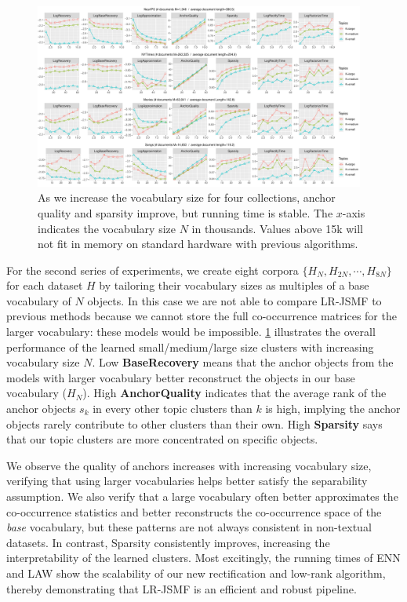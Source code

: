 \begin{figure}[ht]
 	\centering
	\includegraphics[width=0.97\textwidth, trim={1.0cm 1.0cm 1.0cm 0.0cm}]
	{./lrtm/pics/real_TopicsPerVocabs_new-plain.pdf}
	\caption{As we increase the vocabulary size for four collections, anchor
	quality and sparsity improve, but running time is stable. The $x$\hyp{}axis
	indicates the vocabulary size $N$ in thousands. Values above 15k will not fit
	in memory on standard hardware with previous algorithms.}
	\label{fig:results-vocabs}
\end{figure}

For the second series of experiments, we create eight corpora $\{H_N, H_{2N},
\cdots, H_{8N}\}$ for each dataset $H$ by tailoring their vocabulary sizes as
multiples of a base vocabulary of $N$ objects. In this case we are not able to
compare LR\hyp{}JSMF to previous methods because we cannot store the full 
co\hyp{}occurrence matrices for the larger vocabulary: these models would be
impossible. \cref{fig:results-vocabs} illustrates the overall performance
of the learned small/medium/large size clusters with increasing vocabulary size
$N$. Low \textbf{BaseRecovery} means that the anchor objects from the models
with larger vocabulary better reconstruct the objects in our base vocabulary 
($H_N$). High \textbf{AnchorQuality} indicates that the average rank of the
anchor objects $s_k$ in every other topic clusters than $k$ is high, implying
the anchor objects rarely contribute to other clusters than their own. High 
\textbf{Sparsity}  \cite{Hoyer2004} says that our topic clusters
are
more concentrated on specific objects.

We observe the quality of anchors increases with increasing vocabulary size,
verifying that using larger vocabularies helps better satisfy the separability
assumption. We also verify that a large vocabulary often better approximates the
co\hyp{}occurrence statistics and better reconstructs the co\hyp{}occurrence
space of the \textit{base} vocabulary, but these patterns are not always
consistent in non\hyp{}textual datasets. In contrast, Sparsity consistently
improves, increasing the interpretability of the learned clusters. Most
excitingly, the running times of ENN and LAW show the scalability of our new
rectification and low\hyp{}rank algorithm, thereby demonstrating that 
LR\hyp{}JSMF is an efficient and robust pipeline.

